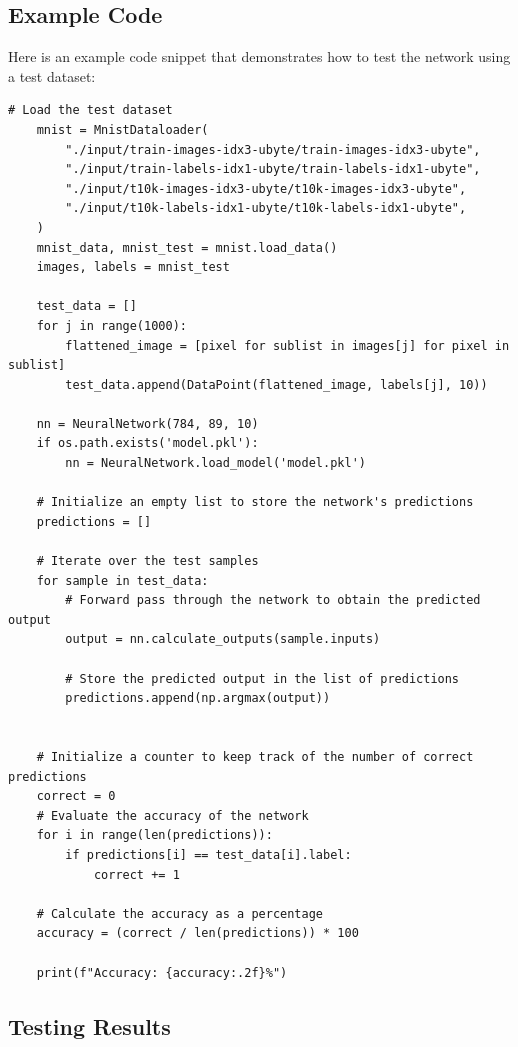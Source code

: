 \documentclass{article}
\begin{document}
\newpage
\subsection{Example Code}

Here is an example code snippet that demonstrates how to test the network using a test dataset:

\begin{verbatim}
# Load the test dataset
    mnist = MnistDataloader(
        "./input/train-images-idx3-ubyte/train-images-idx3-ubyte",
        "./input/train-labels-idx1-ubyte/train-labels-idx1-ubyte",
        "./input/t10k-images-idx3-ubyte/t10k-images-idx3-ubyte",
        "./input/t10k-labels-idx1-ubyte/t10k-labels-idx1-ubyte",
    )
    mnist_data, mnist_test = mnist.load_data()
    images, labels = mnist_test
    
    test_data = []
    for j in range(1000):
        flattened_image = [pixel for sublist in images[j] for pixel in sublist]
        test_data.append(DataPoint(flattened_image, labels[j], 10))
    
    nn = NeuralNetwork(784, 89, 10)
    if os.path.exists('model.pkl'):
        nn = NeuralNetwork.load_model('model.pkl')
    
    # Initialize an empty list to store the network's predictions
    predictions = []
    
    # Iterate over the test samples
    for sample in test_data:
        # Forward pass through the network to obtain the predicted output
        output = nn.calculate_outputs(sample.inputs)
        
        # Store the predicted output in the list of predictions
        predictions.append(np.argmax(output))
        
    
    # Initialize a counter to keep track of the number of correct predictions
    correct = 0
    # Evaluate the accuracy of the network
    for i in range(len(predictions)):
        if predictions[i] == test_data[i].label:
            correct += 1
    
    # Calculate the accuracy as a percentage
    accuracy = (correct / len(predictions)) * 100
    
    print(f"Accuracy: {accuracy:.2f}%")
\end{verbatim}

\subsection{Testing Results}
\end{document}

